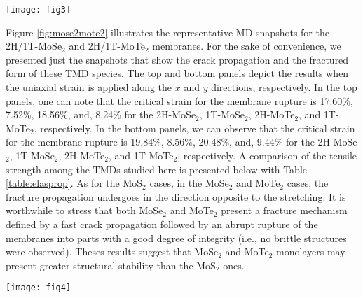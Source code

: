 \documentclass[a4paper,fleqn]{cas-sc}
\begin{document}
\begin{figure*}[pos=ht]
\centering
\texttt{[image: fig3]}
\caption{Representative MD snapshots of the fracture dynamics for the 1T-MoS$_2$ (top sequence of panels) and 1T-MoS$_2$ (bottom sequence of panels) monolayers at 300K and considering a uniaxial strain applied along the $y$-direction.}
\label{fig:mos2y}
\end{figure*}

Figure \ref{fig:mose2mote2} illustrates the representative MD snapshots for the 2H/1T-MoSe$_{2}$ and 2H/1T-MoTe$_{2}$ membranes. For the sake of convenience, we presented just the snapshots that show the crack propagation and the fractured form of these TMD species. The top and bottom panels depict the results when the uniaxial strain is applied along the $x$ and $y$ directions, respectively. In the top panels, one can note that the critical strain for the membrane rupture is 17.60\%, 7.52\%, 18.56\%, and, 8.24\% for the 2H-MoSe$_{2}$, 1T-MoSe$_{2}$, 2H-MoTe$_{2}$, and 1T-MoTe$_{2}$, respectively. In the bottom panels, we can observe that the critical strain for the membrane rupture is 19.84\%, 8.56\%, 20.48\%, and, 9.44\% for the 2H-MoSe$_{2}$, 1T-MoSe$_{2}$, 2H-MoTe$_{2}$, and 1T-MoTe$_{2}$, respectively. A comparison of the tensile strength among the TMDs studied here is presented below with Table \ref{table:elasprop}. As for the MoS$_2$ cases, in the MoSe$_{2}$ and MoTe$_{2}$ cases, the fracture propagation undergoes in the direction opposite to the stretching. It is worthwhile to stress that both MoSe$_{2}$ and MoTe$_{2}$ present a fracture mechanism defined by a fast crack propagation followed by an abrupt rupture of the membranes into parts with a good degree of integrity (i.e., no brittle structures were observed). Theses results suggest that MoSe$_2$ and MoTe$_2$ monolayers may present greater structural stability than the MoS$_2$ ones.      

\begin{figure*}[pos=ht]
\centering
\texttt{[image: fig4]}
\caption{Representative MD snapshots of the fracture dynamics for the 2H/1T-MoSe$_2$ and 2H/1T-MoTe$_2$ monolayers at 300K. The top and bottom sequence of panels refer to the simulations considering a uniaxial strain applied along the $x$ and $y$ directions, respectively.}
\label{fig:mose2mote2}
\end{figure*}
\end{document}
